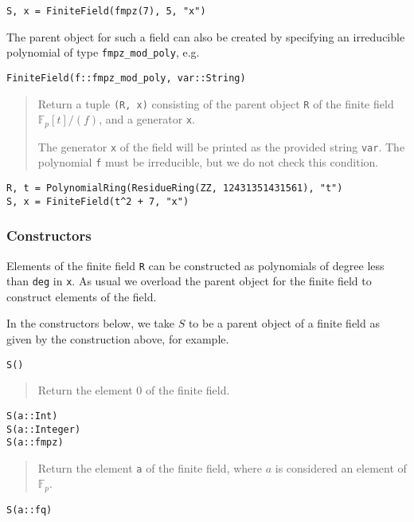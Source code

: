 \documentclass[a4paper,10pt]{article}
\newcommand{\F}{\mathbb{F}}
\newcommand{\code}{\lstinline}
\newcommand{\desc}[1]{\vspace{-3mm}\begin{quote}#1\end{quote}}
\begin{document}
{{\begin{lstlisting}
S, x = FiniteField(fmpz(7), 5, "x")
\end{lstlisting}

The parent object for such a field can also be created by specifying
an irreducible polynomial of type \code{fmpz_mod_poly}, e.g.

\begin{lstlisting}
FiniteField(f::fmpz_mod_poly, var::String)
\end{lstlisting}

\desc{Return a tuple \code{(R, x)} consisting of the parent object \code{R} of
the finite field $\F_p[t]/(f)$, and a generator \code{x}.

The generator \code{x} of the field will be printed as the provided string
\code{var}. The polynomial \code{f} must be irreducible, but we do not check this
condition.}

\begin{lstlisting}
R, t = PolynomialRing(ResidueRing(ZZ, 12431351431561), "t")
S, x = FiniteField(t^2 + 7, "x")
\end{lstlisting}

\subsubsection{Constructors}

Elements of the finite field \code{R} can be constructed as polynomials of
degree less than \code{deg} in \code{x}. As usual we overload the parent object
for the finite field to construct elements of the field.

In the constructors below, we take $S$ to be a parent object of a finite field
as given by the construction above, for example.

\begin{lstlisting}
S()
\end{lstlisting}

\desc{Return the element $0$ of the finite field.}

\begin{lstlisting}
S(a::Int)
S(a::Integer)
S(a::fmpz)
\end{lstlisting}

\desc{Return the element \code{a} of the finite field, where $a$ is considered 
an element of $\F_p$.}

\begin{lstlisting}
S(a::fq)
\end{lstlisting}

}}
\end{document}
